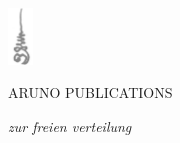 \documentclass[
  11pt,
  oneside,
  final,
  showtrims,
]{memoir}
\begin{document}
\centering

\mbox{}\vfill

\includegraphics[height=15mm,keepaspectratio]{buddho.jpg}
\vspace*{3mm}

ARUNO PUBLICATIONS
\vspace*{4mm}

\emph{zur freien verteilung}
\vspace*{9mm}
\end{document}
